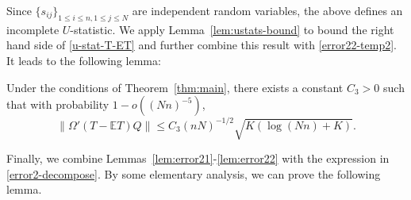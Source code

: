 \documentclass[preprint,11pt]{article}
\newcommand{\mbb}{\mathbb}
\newcommand{\bg}{{\boldsymbol g}}
\numberwithin{equation}{section}
\begin{document}
Since $\{s_{ij}\}_{1\leq i\leq n,1\leq j\leq N}$ are independent random variables, the above defines an incomplete $U$-statistic. We apply Lemma~\ref{lem:ustats-bound} to bound the right hand side of \eqref{u-stat-T-ET} and further combine this result with \eqref{error22-temp2}. It leads to the following lemma:
\begin{lemma} \label{lem:error22}
Under the conditions of Theorem~\ref{thm:main}, 
there exists a constant $C_3>0$ such that with probability $1-o((Nn)^{-5})$,  %
\[
\|\Omega'(T-\mathbb{E}T)Q\|\le C_3(nN)^{-1/2}\sqrt{K(\log(Nn)+K)}.
\]
\end{lemma}

Finally, we combine Lemmas~\ref{lem:error21}-\ref{lem:error22} with the expression in  \eqref{error2-decompose}. By some elementary analysis, we can prove the following lemma. 


\end{document}
